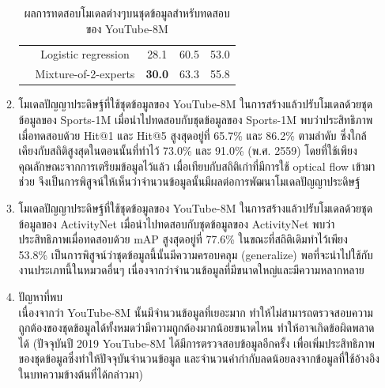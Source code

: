 \begin{enumerate}
\begin{enumerate}
\begin{table}[!ht]
\begin{tabular}{|c|c|c|c|c|}
					& Logistic regression & 28.1 & 60.5 & 53.0\\
					& Mixture-of-2-experts & \textbf{30.0} & 63.3 & 55.8\\
					\hline
				\end{tabular}
				\caption{ผลการทดสอบโมเดลต่างๆบนชุดข้อมูลสำหรับทดสอบของ YouTube-8M}
				\label{tab: youtube_youtube}
			\end{table}
			\clearpage
		\item โมเดลปัญญาประดิษฐ์ที่ใช้ชุดข้อมูลของ YouTube-8M ในการสร้างแล้วปรับโมเดลด้วยชุดข้อมูลของ Sports-1M เมื่อนำไปทดสอบกับชุดข้อมูลของ Sports-1M 
		พบว่าประสิทธิภาพเมื่อทดสอบด้วย Hit@1 และ Hit@5 สูงสุดอยู่ที่ 65.7\% และ 86.2\% ตามลำดับ ซึ่งใกล้เคียงกับสถิติสูงสุดในตอนนั้นที่ทำไว้ 73.0\% และ 91.0\% (พ.ศ. 2559) 
		โดยที่ใช้เพียงคุณลักษณะจากการเตรียมข้อมูลไว้แล้ว เมื่อเทียบกับสถิติเก่าที่มีการใช้ optical flow เข้ามาช่วย จึงเป็นการพิสูจน์ให้เห็นว่าจำนวนข้อมูลนั้นมีผลต่อการพัฒนาโมเดลปัญญาประดิษฐ์
			
		\item โมเดลปัญญาประดิษฐ์ที่ใช้ชุดข้อมูลของ YouTube-8M ในการสร้างแล้วปรับโมเดลด้วยชุดข้อมูลของ ActivityNet เมื่อนำไปทดสอบกับชุดข้อมูลของ ActivityNet 
		พบว่าประสิทธิภาพเมื่อทดสอบด้วย mAP สูงสุดอยู่ที่ 77.6\% ในขณะที่สถิติเดิมทำไว้เพียง 53.8\% เป็นการพิสูจน์ว่าชุดข้อมูลนี้นั้นมีความครอบคลุม (generalize) 
		พอที่จะนำไปใช้กับงานประเภทนี้ในหมวดอื่นๆ เนื่องจากว่าจำนวนข้อมูลที่มีขนาดใหญ่และมีความหลากหลาย
		
		\item ปัญหาที่พบ\\
		เนื่องจากว่า YouTube-8M นั้นมีจำนวนข้อมูลที่เยอะมาก ทำให้ไม่สามารถตรวจสอบความถูกต้องของชุดข้อมูลได้ทั้งหมดว่ามีความถูกต้องมากน้อยขนาดไหน 
		ทำให้อาจเกิดข้อผิดพลาดได้ (ปัจจุบันปี 2019 YouTube-8M ได้มีการตรวจสอบข้อมูลอีกครั้ง เพื่อเพิ่มประสิทธิภาพของชุดข้อมูลซึ่งทำให้ปัจจุบันจำนวนข้อมูล 
		และจำนวนคำกำกับลดน้อยลงจากข้อมูลที่ใช้อ้างอิงในบทความข้างต้นที่ได้กล่าวมา)
	\end{enumerate}	
\end{enumerate}
